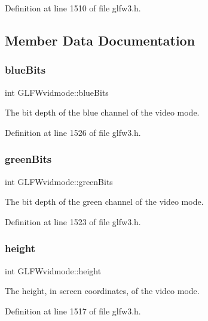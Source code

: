 Definition at line 1510 of file glfw3.\+h.



\subsection{Member Data Documentation}
\mbox{\label{struct_g_l_f_wvidmode_af310977f58d2e3b188175b6e3d314047}} 
\subsubsection{\texorpdfstring{blueBits}{blueBits}}
{\footnotesize\ttfamily int G\+L\+F\+Wvidmode\+::blue\+Bits}

The bit depth of the blue channel of the video mode. 

Definition at line 1526 of file glfw3.\+h.

\mbox{\label{struct_g_l_f_wvidmode_a292fdd281f3485fb3ff102a5bda43faa}} 
\subsubsection{\texorpdfstring{greenBits}{greenBits}}
{\footnotesize\ttfamily int G\+L\+F\+Wvidmode\+::green\+Bits}

The bit depth of the green channel of the video mode. 

Definition at line 1523 of file glfw3.\+h.

\mbox{\label{struct_g_l_f_wvidmode_ac65942a5f6981695517437a9d571d03c}} 
\subsubsection{\texorpdfstring{height}{height}}
{\footnotesize\ttfamily int G\+L\+F\+Wvidmode\+::height}

The height, in screen coordinates, of the video mode. 

Definition at line 1517 of file glfw3.\+h.

\mbox{\label{struct_g_l_f_wvidmode_a6066c4ecd251098700062d3b735dba1b}} 
